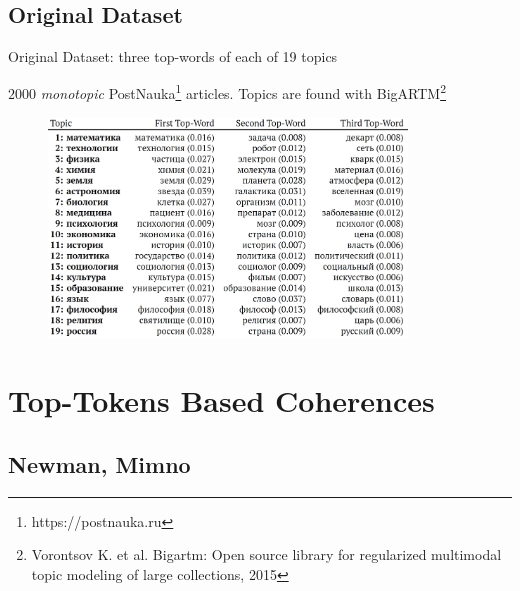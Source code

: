 \documentclass[russian]{beamer}
\begin{document}
\subsection{Original Dataset}

\begin{frame}{Original Dataset: three top-words of each of 19 topics}

  {\small
    $2000$ \emph{monotopic} PostNauka\footnote[frame]{https://postnauka.ru} articles. Topics are found with BigARTM\footnote[frame]{Vorontsov K. et al. Bigartm: Open source library for regularized multimodal topic modeling of large collections, 2015}
  }
  
  \begin{figure}[h]
    \centering
    \includegraphics[width=0.85\textwidth]{topwords.jpg}
  \end{figure}
\end{frame}

\section{Top-Tokens Based Coherences}


\subsection{Newman, Mimno}
\end{document}

